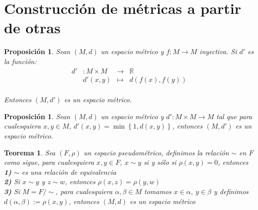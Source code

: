 \documentclass[oneside]{book} %
\theoremstyle{Teorema}
\newtheorem{Teorema}[Definicion]{Teorema}
\newtheorem{Proposicion}[Definicion]{Proposición}
\theoremstyle{Ejemplos}
\theoremstyle{[Obs]}
\renewcommand{\{}{\left\lbrace} %
\renewcommand{\}}{\right\rbrace} %
\newcommand{\R}{\mathbb{R}} %
\begin{document}
		\section{Construcción de métricas a partir de otras}

			\begin{Proposicion}

				Sean $(M, d)$ un espacio métrico y $f : M \to M$ inyectiva. Si $d'$ es la función: \\

				\[\begin{matrix}
						
					d' & : M \times M & \to & \R \\

					& d'(x, y) & \mapsto & d(f(x), f(y)) 

				\end{matrix} \] \\

				Entonces $(M, d')$ es un espacio métrico.

			\end{Proposicion}

			\begin{Proposicion}
				
				Sean $(M, d)$ un espacio métrico y $d' : M \times M \to M$ tal que para cualesquiera $x, y \in M$, $d'(x, y) = \min\{ 1, d(x, y) \}$, entonces $(M, d')$ es un espacio métrico. \\

			\end{Proposicion}

			\begin{Teorema}
				
				Sea $(F, \rho)$ un espacio pseudométrico, definimos la relación $\sim$  en $F$ como sigue, para cualesquiera $x, y \in F$, $x \sim y$ si y sólo si $\rho(x, y) = 0$, entonces \\
				
				\textbf{1)} $\sim$ es una relación de equivalencia \\
				
				\textbf{2)} Si $x \sim y$ y $z \sim w$, entonces $\rho(x, z) = \rho(y, w)$ \\

				\textbf{3)} Si $M = F/\sim$, para cualesquiera $\alpha, \beta \in M$ tomamos $x \in \alpha$, $y \in \beta$ y definimos $d(\alpha, \beta) := \rho(x, y)$, entonces $(M, d)$ es un espacio métrico \\

			\end{Teorema}
\end{document}
